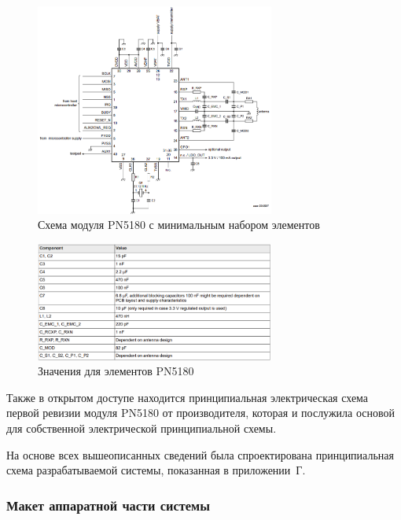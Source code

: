 \begin{figure}[H]
    \centering
    \includegraphics[width=0.7\textwidth]{images/design/pn5180mincomp}
    \caption{\centering Схема модуля PN5180 с минимальным набором элементов}
    \label{fig:pn5180mincomp}
\end{figure}

\begin{figure}[H]
    \centering
    \includegraphics[width=0.7\textwidth]{images/design/pn5180mincompvalues}
    \caption{\centering Значения для элементов PN5180}
    \label{fig:pn5180mincompvalues}
\end{figure}

Также в открытом доступе находится принципиальная электрическая схема первой ревизии модуля PN5180 от производителя, которая и послужила основой для собственной электрической принципиальной схемы\cite{pn5180_schematic}.


На основе всех вышеописанных сведений была спроектирована принципиальная схема разрабатываемой системы, показанная в приложении~Г.





\subsubsection{Макет аппаратной части системы}

